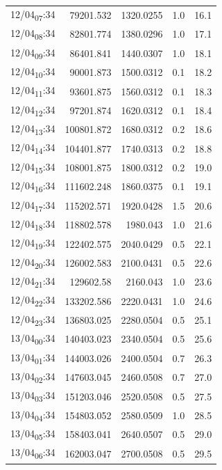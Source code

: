 \documentclass[11pt]{article}
\begin{document}
\begin{center}
\begin{tabular}{lrrrr}
12/04\textsubscript{07}:34 & 79201.532 & 1320.0255 & 1.0 & 16.1\\[0pt]
12/04\textsubscript{08}:34 & 82801.774 & 1380.0296 & 1.0 & 17.1\\[0pt]
12/04\textsubscript{09}:34 & 86401.841 & 1440.0307 & 1.0 & 18.1\\[0pt]
12/04\textsubscript{10}:34 & 90001.873 & 1500.0312 & 0.1 & 18.2\\[0pt]
12/04\textsubscript{11}:34 & 93601.875 & 1560.0312 & 0.1 & 18.3\\[0pt]
12/04\textsubscript{12}:34 & 97201.874 & 1620.0312 & 0.1 & 18.4\\[0pt]
12/04\textsubscript{13}:34 & 100801.872 & 1680.0312 & 0.2 & 18.6\\[0pt]
12/04\textsubscript{14}:34 & 104401.877 & 1740.0313 & 0.2 & 18.8\\[0pt]
12/04\textsubscript{15}:34 & 108001.875 & 1800.0312 & 0.2 & 19.0\\[0pt]
12/04\textsubscript{16}:34 & 111602.248 & 1860.0375 & 0.1 & 19.1\\[0pt]
12/04\textsubscript{17}:34 & 115202.571 & 1920.0428 & 1.5 & 20.6\\[0pt]
12/04\textsubscript{18}:34 & 118802.578 & 1980.043 & 1.0 & 21.6\\[0pt]
12/04\textsubscript{19}:34 & 122402.575 & 2040.0429 & 0.5 & 22.1\\[0pt]
12/04\textsubscript{20}:34 & 126002.583 & 2100.0431 & 0.5 & 22.6\\[0pt]
12/04\textsubscript{21}:34 & 129602.58 & 2160.043 & 1.0 & 23.6\\[0pt]
12/04\textsubscript{22}:34 & 133202.586 & 2220.0431 & 1.0 & 24.6\\[0pt]
12/04\textsubscript{23}:34 & 136803.025 & 2280.0504 & 0.5 & 25.1\\[0pt]
13/04\textsubscript{00}:34 & 140403.023 & 2340.0504 & 0.5 & 25.6\\[0pt]
13/04\textsubscript{01}:34 & 144003.026 & 2400.0504 & 0.7 & 26.3\\[0pt]
13/04\textsubscript{02}:34 & 147603.045 & 2460.0508 & 0.7 & 27.0\\[0pt]
13/04\textsubscript{03}:34 & 151203.046 & 2520.0508 & 0.5 & 27.5\\[0pt]
13/04\textsubscript{04}:34 & 154803.052 & 2580.0509 & 1.0 & 28.5\\[0pt]
13/04\textsubscript{05}:34 & 158403.041 & 2640.0507 & 0.5 & 29.0\\[0pt]
13/04\textsubscript{06}:34 & 162003.047 & 2700.0508 & 0.5 & 29.5\\[0pt]

\end{tabular}
\end{center}
\end{document}
